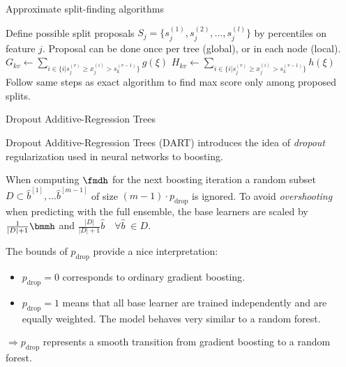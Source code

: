 \begin{vbframe}{Approximate split-finding algorithms}
\begin{algorithm}[H]
\begin{footnotesize}
\begin{center}
  \begin{algorithmic}[1]
      \State Define possible split proposals $S_j = \{s_{j}^{(1)}, s_{j}^{(2)}, \hdots, s_{j}^{(l)}\}$ by percentiles on feature $j$.
      \State Proposal can be done once per tree (global), or in each node (local).
    \EndFor
      \State ${G}_{kv} \gets \sum_{i \in \{i|s_j^{(v)} \geq x_j^{(i)} > s_{k}^{(v - 1)}\}} g(\xi)$
      \State ${H}_{kv} \gets \sum_{i \in \{i|s_j^{(v)} \geq x_j^{(i)} > s_{k}^{(v - 1)}\}} h(\xi)$
    \EndFor
    \State Follow same steps as exact algorithm to find max score only among proposed splits.
  \end{algorithmic}
\end{center}
\end{footnotesize}
\caption{Approximate algorithm for split finding}
\end{algorithm}

\end{vbframe}

\begin{vbframe}{Dropout Additive-Regression Trees}

  Dropout Additive-Regression Trees (DART) introduces the idea of \emph{dropout} regularization used in neural networks to boosting.

  \lz

  When computing $\fmdh$ for the next boosting iteration a random subset $D \subset \hat{b}^{[1]}, \dots \hat{b}^{[m-1]}$ of size $(m-1) \cdot p_\text{drop}$ is ignored.
  To avoid \emph{overshooting} when predicting with the full ensemble, the base learners are scaled by $\frac{1}{|D| + 1}\bmmh$ and $\frac{|D|}{|D| + 1}\hat{b}\quad \forall \hat{b}\;\in D$.

  \lz

  The bounds of $p_\text{drop}$ provide a nice interpretation:
  \begin{itemize}
    \item $p_\text{drop}=0$ corresponds to ordinary gradient boosting.
    \item $p_\text{drop}=1$ means that all base learner are trained independently and are equally weighted. The model behaves very similar to a random forest.
  \end{itemize}
  $\Rightarrow p_\text{drop}$ represents a smooth transition from gradient boosting to a random forest.



\end{vbframe}


